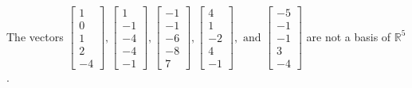 \begin{exercise}
\begin{exerciseStatement}
  \end{exerciseStatement}
  \begin{exerciseAnswer}
   The vectors \(\left[\begin{array}{r}
1 \\
0 \\
1 \\
2 \\
-4
\end{array}\right] , \left[\begin{array}{r}
1 \\
-1 \\
-4 \\
-4 \\
-1
\end{array}\right] , \left[\begin{array}{r}
-1 \\
-1 \\
-6 \\
-8 \\
7
\end{array}\right] , \left[\begin{array}{r}
4 \\
1 \\
-2 \\
4 \\
-1
\end{array}\right] , \text{ and } \left[\begin{array}{r}
-5 \\
-1 \\
-1 \\
3 \\
-4
\end{array}\right]\) 
  	 are not  a basis of \(\mathbb{R}^5\).
  


  \end{exerciseAnswer}
\end{exercise}